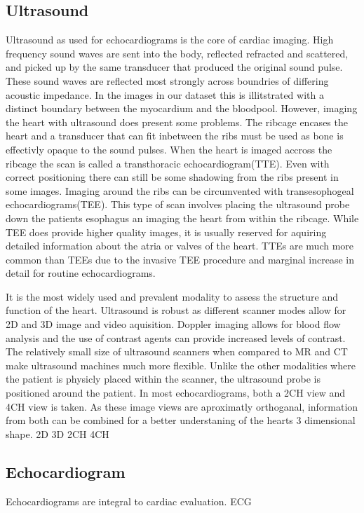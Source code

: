 \documentclass[12pt]{article}
\begin{document}
\subsection{Ultrasound}
Ultrasound as used for echocardiograms is the core of cardiac imaging. 
High frequency sound waves are sent into the body, reflected refracted and scattered, and picked up by the same transducer that produced the original sound pulse. 
These sound waves are reflected most strongly across boundries of differing acoustic impedance.
In the images in our dataset this is illitstrated with a distinct boundary between the myocardium and the bloodpool.
However, imaging the heart with ultrasound does present some problems.
The ribcage encases the heart and a transducer that can fit inbetween the ribs must be used as bone is effectivly opaque to the sound pulses. 
When the heart is imaged accross the ribcage the scan is called a transthoracic echocardiogram(TTE).
Even with correct positioning there can still be some shadowing from the ribs present in some images.
Imaging around the ribs can be circumvented with transesophogeal echocardiograms(TEE). 
This type of scan involves placing the ultrasound probe down the patients esophagus an imaging the heart from within the ribcage.
While TEE does provide higher quality images, it is usually reserved for aquiring detailed information about the atria or valves of the heart.
TTEs are much more common than TEEs due to the invasive TEE procedure and marginal increase in detail for routine echocardiograms.

It is the most widely used and prevalent modality to assess the structure and function of the heart.
Ultrasound is robust as different scanner modes allow for 2D and 3D image and video aquisition.
Doppler imaging allows for blood flow analysis and the use of contrast agents can provide increased levels of contrast.
The relatively small size of ultrasound scanners when compared to MR and CT make ultrasound machines much more flexible.
Unlike the other modalities where the patient is physicly placed within the scanner, the ultrasound probe is positioned around the patient.
In most echocardiograms, both a 2CH view and 4CH view is taken. 
As these image views are aproximatly orthoganal, information from both can be combined for a better understaning of the hearts 3 dimensional shape.
2D
3D
2CH
4CH
\subsection{Echocardiogram}
Echocardiograms are integral to cardiac evaluation.
ECG
\end{document}
